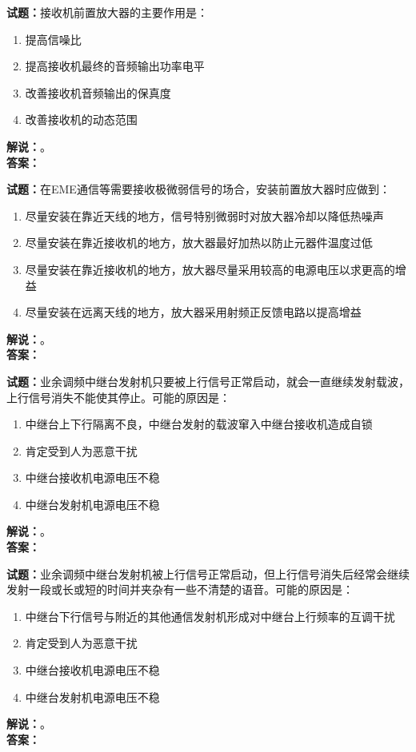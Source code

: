 \documentclass{ctexbook}
\begin{document}
\bigskip




\noindent\textbf{试题：}接收机前置放大器的主要作用是：
\begin{enumerate}[leftmargin=3em]
\item 提高信噪比
\item 提高接收机最终的音频输出功率电平
\item 改善接收机音频输出的保真度
\item 改善接收机的动态范围
\end{enumerate}
\noindent\textbf{解说：}\textbf{}。\\\noindent\textbf{答案：}

\bigskip




\noindent\textbf{试题：}在EME通信等需要接收极微弱信号的场合，安装前置放大器时应做到：
\begin{enumerate}[leftmargin=3em]
\item 尽量安装在靠近天线的地方，信号特别微弱时对放大器冷却以降低热噪声
\item 尽量安装在靠近接收机的地方，放大器最好加热以防止元器件温度过低
\item 尽量安装在靠近接收机的地方，放大器尽量采用较高的电源电压以求更高的增益
\item 尽量安装在远离天线的地方，放大器采用射频正反馈电路以提高增益
\end{enumerate}
\noindent\textbf{解说：}\textbf{}。\\\noindent\textbf{答案：}

\bigskip




\noindent\textbf{试题：}业余调频中继台发射机只要被上行信号正常启动，就会一直继续发射载波，上行信号消失不能使其停止。可能的原因是：
\begin{enumerate}[leftmargin=3em]
\item 中继台上下行隔离不良，中继台发射的载波窜入中继台接收机造成自锁
\item 肯定受到人为恶意干扰
\item 中继台接收机电源电压不稳
\item 中继台发射机电源电压不稳
\end{enumerate}
\noindent\textbf{解说：}\textbf{}。\\\noindent\textbf{答案：}

\bigskip




\noindent\textbf{试题：}业余调频中继台发射机被上行信号正常启动，但上行信号消失后经常会继续发射一段或长或短的时间并夹杂有一些不清楚的语音。可能的原因是：
\begin{enumerate}[leftmargin=3em]
\item 中继台下行信号与附近的其他通信发射机形成对中继台上行频率的互调干扰
\item 肯定受到人为恶意干扰
\item 中继台接收机电源电压不稳
\item 中继台发射机电源电压不稳
\end{enumerate}
\noindent\textbf{解说：}\textbf{}。\\\noindent\textbf{答案：}
\end{document}
